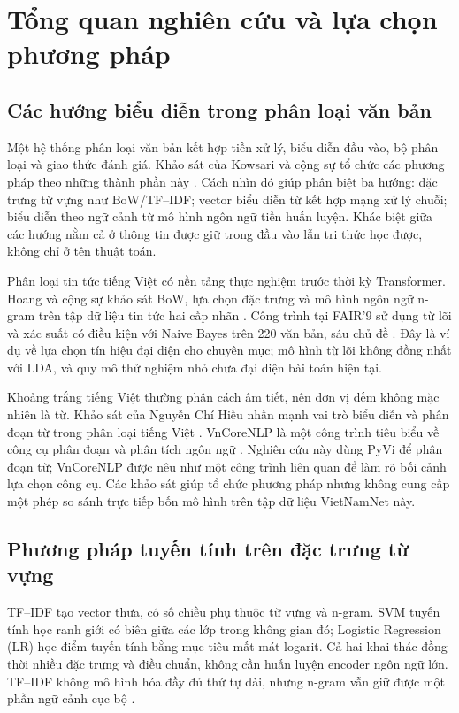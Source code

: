 \chapter{Tổng quan nghiên cứu và lựa chọn phương pháp}
\label{chap:related}
\FloatBarrier
\section{Các hướng biểu diễn trong phân loại văn bản}
Một hệ thống phân loại văn bản kết hợp tiền xử lý, biểu diễn đầu vào, bộ phân loại và giao thức đánh giá. Khảo sát của Kowsari và cộng sự tổ chức các phương pháp theo những thành phần này \citep{kowsari2019}. Cách nhìn đó giúp phân biệt ba hướng: đặc trưng từ vựng như BoW/TF--IDF; vector biểu diễn từ kết hợp mạng xử lý chuỗi; biểu diễn theo ngữ cảnh từ mô hình ngôn ngữ tiền huấn luyện. Khác biệt giữa các hướng nằm cả ở thông tin được giữ trong đầu vào lẫn tri thức học được, không chỉ ở tên thuật toán.

Phân loại tin tức tiếng Việt có nền tảng thực nghiệm trước thời kỳ Transformer. Hoang và cộng sự khảo sát BoW, lựa chọn đặc trưng và mô hình ngôn ngữ n-gram trên tập dữ liệu tin tức hai cấp nhãn \citep{hoang2007}. Công trình tại FAIR'9 sử dụng từ lõi và xác suất có điều kiện với Naive Bayes trên 220 văn bản, sáu chủ đề \citep{linh2016}. Đây là ví dụ về lựa chọn tín hiệu đại diện cho chuyên mục; mô hình từ lõi không đồng nhất với LDA, và quy mô thử nghiệm nhỏ chưa đại diện bài toán hiện tại.

Khoảng trắng tiếng Việt thường phân cách âm tiết, nên đơn vị đếm không mặc nhiên là từ. Khảo sát của Nguyễn Chí Hiếu nhấn mạnh vai trò biểu diễn và phân đoạn từ trong phân loại tiếng Việt \citep{hieu2022}. VnCoreNLP là một công trình tiêu biểu về công cụ phân đoạn và phân tích ngôn ngữ \citep{vncorenlp2018}. Nghiên cứu này dùng PyVi để phân đoạn từ; VnCoreNLP được nêu như một công trình liên quan để làm rõ bối cảnh lựa chọn công cụ. Các khảo sát giúp tổ chức phương pháp nhưng không cung cấp một phép so sánh trực tiếp bốn mô hình trên tập dữ liệu VietNamNet này.

\FloatBarrier
\section{Phương pháp tuyến tính trên đặc trưng từ vựng}
TF--IDF tạo vector thưa, có số chiều phụ thuộc từ vựng và n-gram. SVM tuyến tính học ranh giới có biên giữa các lớp trong không gian đó; Logistic Regression (LR) học điểm tuyến tính bằng mục tiêu mất mát logarit. Cả hai khai thác đồng thời nhiều đặc trưng và điều chuẩn, không cần huấn luyện encoder ngôn ngữ lớn. TF--IDF không mô hình hóa đầy đủ thứ tự dài, nhưng n-gram vẫn giữ được một phần ngữ cảnh cục bộ \citep{kowsari2019}.

